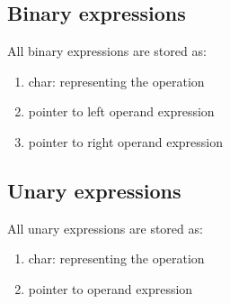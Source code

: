 \subsection{Binary expressions}
\label{app:common:expr:binary}

All binary expressions are stored as:

\begin{enumerate}
\item char: representing the operation
\item pointer to left operand expression
\item pointer to right operand expression
\end{enumerate}

\subsection{Unary expressions}
\label{app:common:expr:unary}

All unary expressions are stored as:

\begin{enumerate}
\item char: representing the operation
\item pointer to operand expression
\end{enumerate}



